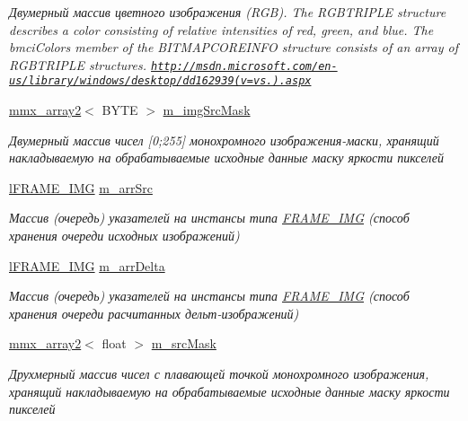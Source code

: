 \begin{DoxyCompactItemize}
\begin{DoxyCompactList}\small\item\em Двумерный массив цветного изображения (R\+G\+B). The R\+G\+B\+T\+R\+I\+P\+L\+E structure describes a color consisting of relative intensities of red, green, and blue. The bmci\+Colors member of the B\+I\+T\+M\+A\+P\+C\+O\+R\+E\+I\+N\+F\+O structure consists of an array of R\+G\+B\+T\+R\+I\+P\+L\+E structures. \href{http://msdn.microsoft.com/en-us/library/windows/desktop/dd162939(v=vs.85).aspx}{\tt http\+://msdn.\+microsoft.\+com/en-\/us/library/windows/desktop/dd162939(v=vs.).\+aspx} \end{DoxyCompactList}\item 
\hyperlink{classmmx__array2}{mmx\+\_\+array2}$<$ B\+Y\+T\+E $>$ \hyperlink{class_c_v_i_engine_base_a879bfc4065da678c4ca67ed828b05a05}{m\+\_\+img\+Src\+Mask}
\begin{DoxyCompactList}\small\item\em Двумерный массив чисел \mbox{[}0;255\mbox{]} монохромного изображения-\/маски, хранящий накладываемую на обрабатываемые исходные данные маску яркости пикселей \end{DoxyCompactList}\item 
\hyperlink{classl_f_r_a_m_e___i_m_g}{l\+F\+R\+A\+M\+E\+\_\+\+I\+M\+G} \hyperlink{class_c_v_i_engine_base_a9b14da4c2f0ccba53a81ab89b89b2a03}{m\+\_\+arr\+Src}
\begin{DoxyCompactList}\small\item\em Массив (очередь) указателей на инстансы типа \hyperlink{class_f_r_a_m_e___i_m_g}{F\+R\+A\+M\+E\+\_\+\+I\+M\+G} (способ хранения очереди исходных изображений) \end{DoxyCompactList}\item 
\hyperlink{classl_f_r_a_m_e___i_m_g}{l\+F\+R\+A\+M\+E\+\_\+\+I\+M\+G} \hyperlink{class_c_v_i_engine_base_abd1077e6704b0f6bbc788c4d3e7f150e}{m\+\_\+arr\+Delta}
\begin{DoxyCompactList}\small\item\em Массив (очередь) указателей на инстансы типа \hyperlink{class_f_r_a_m_e___i_m_g}{F\+R\+A\+M\+E\+\_\+\+I\+M\+G} (способ хранения очереди расчитанных дельт-\/изображений) \end{DoxyCompactList}\item 
\hyperlink{classmmx__array2}{mmx\+\_\+array2}$<$ float $>$ \hyperlink{class_c_v_i_engine_base_a0b3b91816e3f19ec5e531c5ad903be98}{m\+\_\+src\+Mask}
\begin{DoxyCompactList}\small\item\em Друхмерный массив чисел с плавающей точкой монохромного изображения, хранящий накладываемую на обрабатываемые исходные данные маску яркости пикселей \end{DoxyCompactList}\item 

\end{DoxyCompactItemize}
